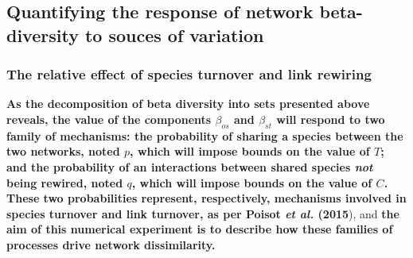 \documentclass[11pt]{article}
\makeatletter
\def\maxwidth{\ifdim\Gin@nat@width>\linewidth\linewidth
\else\Gin@nat@width\fi}
\let\Oldincludegraphics\includegraphics
\renewcommand{\includegraphics}[1]{\Oldincludegraphics[width=\maxwidth]{#1}}
\providecommand{\DIFaddtex}[1]{{\bf #1}} %
\providecommand{\DIFdeltex}[1]{} %
\providecommand{\DIFaddbegin}{\protect\color{blue}} %
\providecommand{\DIFaddend}{\protect\color{black}} %
\providecommand{\DIFdelbegin}{\protect\color{red}} %
\providecommand{\DIFdelend}{\protect\color{black}} %
\providecommand{\DIFadd}[1]{\texorpdfstring{\DIFaddtex{#1}}{#1}} %
\providecommand{\DIFdel}[1]{\texorpdfstring{\DIFdeltex{#1}}{}} %
\newcommand{\DIFscaledelfig}{0.5}
\newlength{\DIFdelgraphicswidth} %
\newlength{\DIFdelgraphicsheight} %
\newcommand{\DIFaddincludegraphics}[2][]{{\color{blue}\fbox{\DIFOincludegraphics[#1]{#2}}}} %
\newcommand{\DIFdelincludegraphics}[2][]{%
\sbox{\DIFdelgraphicsbox}{\DIFOincludegraphics[#1]{#2}}%
\settoboxwidth{\DIFdelgraphicswidth}{\DIFdelgraphicsbox} %
\settoboxtotalheight{\DIFdelgraphicsheight}{\DIFdelgraphicsbox} %
\scalebox{\DIFscaledelfig}{%
\parbox[b]{\DIFdelgraphicswidth}{\usebox{\DIFdelgraphicsbox}\\[-\baselineskip] \rule{\DIFdelgraphicswidth}{0em}}\llap{\resizebox{\DIFdelgraphicswidth}{\DIFdelgraphicsheight}{%
\setlength{\unitlength}{\DIFdelgraphicswidth}%
\begin{picture}(1,1)%
\thicklines\linethickness{2pt} %
{\color[rgb]{1,0,0}\put(0,0){\framebox(1,1){}}}%
{\color[rgb]{1,0,0}\put(0,0){\line( 1,1){1}}}%
{\color[rgb]{1,0,0}\put(0,1){\line(1,-1){1}}}%
\end{picture}%
}\hspace*{3pt}}} %
} %
\DeclareRobustCommand{\DIFaddbegin}{\DIFOaddbegin \let\includegraphics\DIFaddincludegraphics} %
\DeclareRobustCommand{\DIFaddend}{\DIFOaddend \let\includegraphics\DIFOincludegraphics} %
\DeclareRobustCommand{\DIFdelbegin}{\DIFOdelbegin \let\includegraphics\DIFdelincludegraphics} %
\DeclareRobustCommand{\DIFdelend}{\DIFOaddend \let\includegraphics\DIFOincludegraphics} %
\makeatother
\begin{document}
\DIFdelbegin %
\DIFdelend \DIFaddbegin \hypertarget{quantifying-the-response-of-network-beta-diversity-to-souces-of-variation}{%
\subsection{Quantifying the response of network beta-diversity to souces
of
variation}\label{quantifying-the-response-of-network-beta-diversity-to-souces-of-variation}}
\DIFaddend 

\DIFdelbegin \DIFdel{To illustrate the behavior of \(\beta_{st}\), I conducted a
simple
numerical experiment in which two networkshave the same number of interactions \(L\) (recall from the previous section that we do not need
to set a number of species yet}\DIFdelend \DIFaddbegin \hypertarget{the-relative-effect-of-species-turnover-and-link-rewiring}{%
\subsubsection{The relative effect of species turnover and link
rewiring}\label{the-relative-effect-of-species-turnover-and-link-rewiring}}

\DIFadd{As the decomposition of beta diversity into sets presented above
reveals, the value of the components \(\beta_{os}\) and \(\beta_{st}\)
will respond to two family of mechanisms: the probability of sharing a
species between the two networks, noted \(p\), which will impose bounds
on the value of \(T\); and the probability of an interactions between
shared species \emph{not} being rewired, noted \(q\), which will impose
bounds on the value of \(C\). These two probabilities represent,
respectively, mechanisms involved in species turnover and link turnover,
as per Poisot \emph{et al.} (2015}\DIFaddend ), and \DIFdelbegin \DIFdel{these interactions are partitionned
according to proportions \(p_s\) and \(p_r\) into shared (\(A\)), rewired (}\DIFdelend \DIFaddbegin \DIFadd{the aim of this numerical
experiment is to describe how these families of processes drive network
dissimilarity.
}
\end{document}
